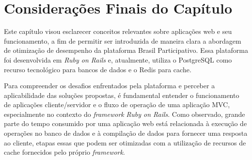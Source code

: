 \section{Considerações Finais do Capítulo}

Este capítulo visou esclarecer conceitos relevantes sobre aplicações web e seu funcionamento, a fim de permitir ser introduzida de maneira clara a abordagem de otimização de desempenho da plataforma Brasil Participativo. Essa plataforma foi desenvolvida em \textit{Ruby on Rails} e, atualmente, utiliza o PostgreSQL como recurso tecnológico para bancos de dados e o Redis para cache.

Para compreender os desafios enfrentados pela plataforma e perceber a aplicabilidade das soluções propostas, é fundamental entender o funcionamento de aplicações cliente/servidor e o fluxo de operação de uma aplicação MVC, especialmente no contexto do \textit{framework} \textit{Ruby on Rails}. Como observado, grande parte do tempo consumido por uma aplicação web está relacionada à execução de operações no banco de dados e à compilação de dados para fornecer uma resposta ao cliente, etapas essas que podem ser otimizadas com a utilização de recursos de cache fornecidos pelo próprio \textit{framework}.